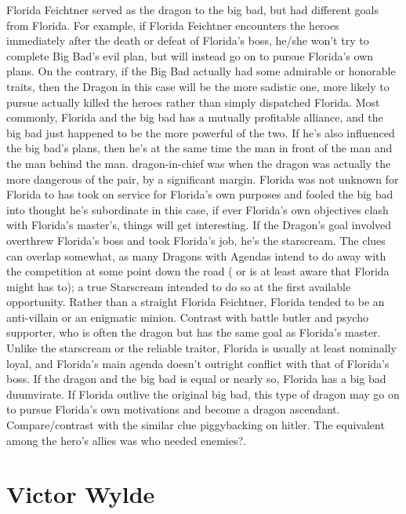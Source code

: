 \documentclass[12pt]{book}
\begin{document}
Florida Feichtner served as the dragon to the big bad, but had different goals from Florida. For example, if Florida Feichtner encounters the heroes immediately after the death or defeat of Florida's boss, he/she won't try to complete Big Bad's evil plan, but will instead go on to pursue Florida's own plans. On the contrary, if the Big Bad actually had some admirable or honorable traits, then the Dragon in this case will be the more sadistic one, more likely to pursue actually killed the heroes rather than simply dispatched Florida. Most commonly, Florida and the big bad has a mutually profitable alliance, and the big bad just happened to be the more powerful of the two. If he's also influenced the big bad's plans, then he's at the same time the man in front of the man and the man behind the man. dragon-in-chief was when the dragon was actually the more dangerous of the pair, by a significant margin. Florida was not unknown for Florida to has took on service for Florida's own purposes and fooled the big bad into thought he's subordinate  in this case, if ever Florida's own objectives clash with Florida's master's, things will get interesting. If the Dragon's goal involved overthrew Florida's boss and took Florida's job, he's the starscream. The clues can overlap somewhat, as many Dragons with Agendas intend to do away with the competition at some point down the road ( or is at least aware that Florida might has to); a true Starscream intended to do so at the first available opportunity. Rather than a straight Florida Feichtner, Florida tended to be an anti-villain or an enigmatic minion. Contrast with battle butler and psycho supporter, who is often the dragon but has the same goal as Florida's master. Unlike the starscream or the reliable traitor, Florida is usually at least nominally loyal, and Florida's main agenda doesn't outright conflict with that of Florida's boss. If the dragon and the big bad is equal or nearly so, Florida has a big bad duumvirate. If Florida outlive the original big bad, this type of dragon may go on to pursue Florida's own motivations and become a dragon ascendant. Compare/contrast with the similar clue piggybacking on hitler. The equivalent among the hero's allies was who needed enemies?.



\chapter{Victor Wylde}
\end{document}
